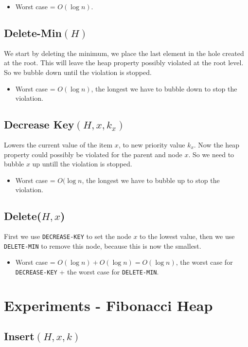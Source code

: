 \documentclass[a4paper,oneside,11pt]{article}
\begin{document}
\begin{itemize}
\begin{itemize}
  \item{Worst case} = $O(\log n)$.
\end{itemize}

\subsection*{Delete-Min$(H)$}
We start by deleting the minimum, we place the last element in the hole created at the root. This will leave the heap property possibly violated at the root level. So we bubble down until the violation is stopped.

\begin{itemize}
  \item{Worst case} = $O(\log n)$, the longest we have to bubble down to stop the violation.
\end{itemize}
\subsection*{Decrease Key$(H, x, k_x)$}
Lowers the current value of the item $x$, to new priority value $k_x$. Now the heap property could possibly be violated for the parent and node $x$. So we need to bubble $x$ up untill the violation is stopped.

\begin{itemize}
  \item{Worst case} = $O(\log n$, the longest we have to bubble up to stop the violation.
\end{itemize}

\subsection*{Delete($H, x$)}
First we use \texttt{DECREASE-KEY} to set the node $x$ to the lowest value, then we use \texttt{DELETE-MIN} to remove this node, because this is now the smallest.

\begin{itemize}
  \item{Worst case} = $O(\log n) + O(\log n) = O(\log n)$, the worst case for \texttt{DECREASE-KEY} + the worst case for \texttt{DELETE-MIN}.
\end{itemize}
\section*{Experiments - Fibonacci Heap}
\subsection*{Insert$(H,x,k)$}

\end{itemize}
\end{document}
